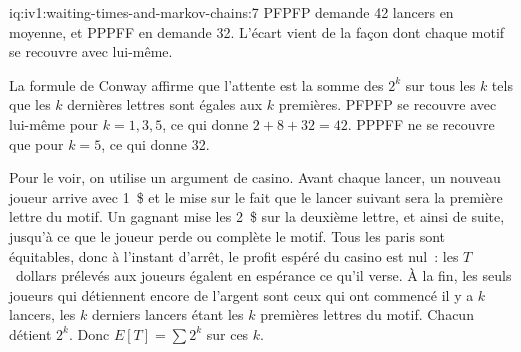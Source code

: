 \begin{solution}{iq:iv1:waiting-times-and-markov-chains:7}
PFPFP demande 42 lancers en moyenne, et PPPFF en demande 32. L'écart vient de la façon dont chaque motif se recouvre avec lui-même.

La formule de Conway affirme que l'attente est la somme des $2^k$ sur tous les $k$ tels que les $k$ dernières lettres sont égales aux $k$ premières. PFPFP se recouvre avec lui-même pour $k = 1, 3, 5$, ce qui donne $2 + 8 + 32 = 42$. PPPFF ne se recouvre que pour $k = 5$, ce qui donne 32.

Pour le voir, on utilise un argument de casino. Avant chaque lancer, un nouveau joueur arrive avec 1~\$ et le mise sur le fait que le lancer suivant sera la première lettre du motif. Un gagnant mise les 2~\$ sur la deuxième lettre, et ainsi de suite, jusqu'à ce que le joueur perde ou complète le motif. Tous les paris sont équitables, donc à l'instant d'arrêt, le profit espéré du casino est nul~: les $T$~dollars prélevés aux joueurs égalent en espérance ce qu'il verse. À la fin, les seuls joueurs qui détiennent encore de l'argent sont ceux qui ont commencé il y a $k$ lancers, les $k$ derniers lancers étant les $k$ premières lettres du motif. Chacun détient $2^k$. Donc $E[T] = \sum 2^k$ sur ces $k$.

\end{solution}

